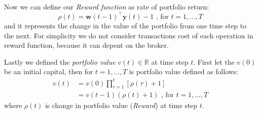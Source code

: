 \documentclass[../xlapes02]{subfiles}
\begin{document}
    Now we can define our \emph{Reward function} as rate of portfolio return:
    \begin{equation}
        \label{eq:rate-of-portfolio-return}
        \rho(t)=\bm{w}(t-1)^\top\bm{y}(t)-1\text{ , for }t=1,\ldots,T
    \end{equation}
    and it represents the change in the value of the portfolio from one time step to the next. For simplicity we do not consider transactions cost of each operation in reward function, because it can depent on the broker.

    Lastly we defined the \emph{portfolio value} $v(t) \in \mathbb{R}$ at time step $t$. First let the $v(0)$ be an initial capital, then for $t=1,\ldots,T$ is portfolio value defined as follows:
    \begin{equation}
        \label{eq:relative-portfolio-value}
        \begin{split}
            v(t) &=v(0)\prod_{\tau=1}^{t}\left[\rho(\tau)+1\right]\\
            &=v(t-1)(\rho(t)+1)
            \text{ , for }t=1,\ldots,T
        \end{split}
    \end{equation}
    where $\rho(t)$ is change in portfolio value (\emph{Reward}) at time step $t$.
\end{document}
